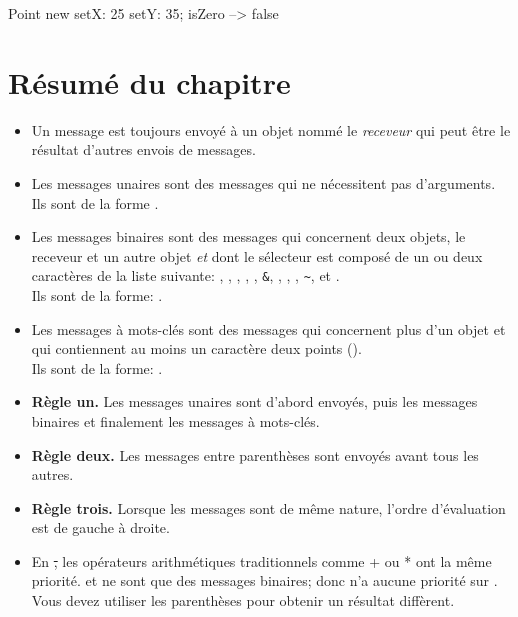 \documentclass[a4paper,10pt,twoside]{book}
\begin{document}
\begin{code}{}
Point new setX: 25 setY: 35; isZero --> false
\end{code}

\section{R\'esum\'e du chapitre}

\begin{itemize}
\item Un message est toujours envoy\'e \`a un objet nomm\'e le \emph{receveur} qui peut \^etre le r\'esultat d'autres envois de messages.

\item Les messages unaires sont des messages qui ne n\'ecessitent pas d'arguments.\\
Ils sont de la forme .

\item Les messages binaires sont des messages qui concernent deux objets, le receveur et un autre objet \emph{et} dont le s\'electeur est compos\'e de un ou deux caract\`eres de la liste suivante: \ct{+}, \ct{-}, \ct{*}, \ct{/}, \ct{|}, \texttt{\&}, \ct{=}, \ct{>}, \ct{<}, \texttt{\~}, et .\\
Ils sont de la forme: .
\item Les messages \`a mots-cl\'es sont des messages qui concernent plus d'un objet et qui contiennent au moins un caract\`ere deux points (\ct{:}). \\
Ils sont de la forme: 
.

\item \textbf{R\`egle un.} Les messages unaires sont d'abord envoy\'es, puis les messages binaires et finalement les messages \`a mots-cl\'es.
\item \textbf{R\`egle deux.} Les messages entre parenth\`eses sont envoy\'es avant tous les autres.
\item \textbf{R\`egle trois.} Lorsque les messages sont de m\^eme nature, l'ordre d'\'evaluation est de gauche \`a droite.
\item En \st, les op\'erateurs arithm\'etiques traditionnels comme +
  ou * ont la m\^eme priorit\'e. \ct{+} et \ct{*} ne sont que des
  messages binaires; donc \ct{*} n'a aucune priorit\'e sur
  \ct{+}. Vous devez utiliser les parenth\`eses pour obtenir un
  r\'esultat diff\`erent.
\end{itemize}

\ifx\wholebook\relax\else
\end{document}
